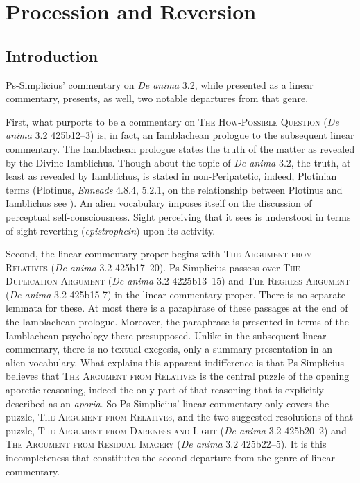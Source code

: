 \chapter{Procession and Reversion} %
\label{cha:procession}

\section{Introduction} %
\label{sec:introduction_pr}

Ps-Simplicius' commentary on \emph{De anima} 3.2, while presented as a linear commentary, presents, as well, two notable departures from that genre. 

First, what purports to be a commentary on \textsc{The How-Possible Question} (\emph{De anima} 3.2 425b12–3) is, in fact, an Iamblachean prologue to the subsequent linear commentary. The Iamblachean prologue states the truth of the matter as revealed by the Divine Iamblichus. Though about the topic of \emph{De anima} 3.2, the truth, at least as revealed by Iamblichus, is stated in non-Peripatetic, indeed, Plotinian terms (Plotinus, \emph{Enneads} 4.8.4, 5.2.1, on the relationship between Plotinus and Iamblichus see \citealt{Steel:1978th}). An alien vocabulary imposes itself on the discussion of perceptual self-consciousness. Sight perceiving that it sees is understood in terms of sight reverting (\emph{epistrophein}) upon its activity.

Second, the linear commentary proper begins with \textsc{The Argument from Relatives} (\emph{De anima} 3.2 425b17–20). Ps-Simplicius passess over \textsc{The Duplication Argument} (\emph{De anima} 3.2 4225b13–15) and \textsc{The Regress Argument} (\emph{De anima} 3.2 425b15-7) in the linear commentary proper. There is no separate lemmata for these. At most there is a paraphrase of these passages at the end of the Iamblachean prologue. Moreover, the paraphrase is presented in terms of the Iamblachean psychology there presupposed. Unlike in the subsequent linear commentary, there is no textual exegesis, only a summary presentation in an alien vocabulary. What explains this apparent indifference is that Ps-Simplicius believes that \textsc{The Argument from Relatives} is the central puzzle of the opening aporetic reasoning, indeed the only part of that reasoning that is explicitly described as an \emph{aporia}. So Ps-Simplicius' linear commentary only covers the puzzle, \textsc{The Argument from Relatives}, and the two suggested resolutions of that puzzle, \textsc{The Argument from Darkness and Light} (\emph{De anima} 3.2 425b20–2) and \textsc{The Argument from Residual Imagery} (\emph{De anima} 3.2 425b22–5). It is this incompleteness that constitutes the second departure from the genre of linear commentary.


